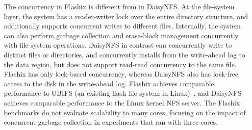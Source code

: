 The concurrency in Flashix is different from in DaisyNFS. At the file-system
layer, the system has a reader-writer lock over the entire directory structure,
and additionally supports concurrent writes to different files. Internally, the
system can also perform garbage collection and erase-block management
concurrently with file-system operations. DaisyNFS in contrast can concurrently
write to distinct files or directories, and concurrently installs from the
write-ahead log to the data region, but does not support read-read concurrency
to the same file. Flashix has only lock-based concurrency, whereas DaisyNFS also
has lock-free access to the disk in the write-ahead log. Flashix achieves
comparable performance to UBIFS (an
existing flash file system in Linux)~\cite{bodenmuller:concurrent-flashix}, and
DaisyNFS achieves comparable performance to the Linux kernel NFS server.
The Flashix benchmarks do not evaluate scalability to many cores, focusing on
the impact of concurrent garbage collection in experiments that ran with three
cores.




